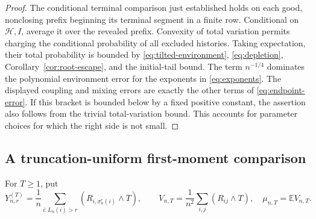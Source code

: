 \documentclass[11pt]{article}
\numberwithin{equation}{section}
\theoremstyle{definition}
\theoremstyle{remark}
\newcommand{\E}{\mathbb E}
\newcommand{\cH}{\mathcal H}
\begin{document}
\begin{proof}
The conditional terminal comparison just established holds on each good, nonclosing prefix beginning its terminal segment in a finite row. Conditional on $\cH,I$, average it over the revealed prefix. Convexity of total variation permits charging the conditional probability of all excluded histories. Taking expectation, their total probability is bounded by \eqref{eq:tilted-environment}, \eqref{eq:depletion}, Corollary~\ref{cor:root-escape}, and the initial-tail bound. The term $n^{-1/4}$ dominates the polynomial environment error for the exponents in \eqref{eq:exponents}. The displayed coupling and mixing errors are exactly the other terms of \eqref{eq:endpoint-error}. If this bracket is bounded below by a fixed positive constant, the assertion also follows from the trivial total-variation bound. This accounts for parameter choices for which the right side is not small.
\end{proof}

\subsection{A truncation-uniform first-moment comparison}
For $T\ge1$, put
\begin{equation}\label{eq:truncations}
 Y_{n,r}^{(T)}=\frac1n\sum_{i:L_n(i)>r}(R_{i,\sigma_n^r(i)}\wedge T),
 \qquad
 V_{n,T}=\frac1{n^2}\sum_{i,j}(R_{ij}\wedge T),
 \quad\mu_{n,T}=\E V_{n,T}.
\end{equation}
\end{document}
